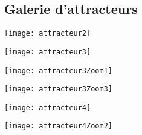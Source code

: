 \documentclass[a4paper,12pt,oneside]{article}
\begin{document}
\subsection{Galerie d'attracteurs}
\newenvironment{changemargin}[2]{\begin{list}{}{%
\setlength{\topsep}{0pt}%
\setlength{\leftmargin}{0pt}%
\setlength{\rightmargin}{0pt}%
\setlength{\listparindent}{\parindent}%
\setlength{\itemindent}{\parindent}%
\setlength{\parsep}{0pt plus 1pt}%
\addtolength{\leftmargin}{#1}%
\addtolength{\rightmargin}{#2}%
}\item }{\end{list}}
\begin{changemargin}{-3cm}{-3cm}

\vspace{0.5cm}
\begin{minipage}{0.65\textwidth}
  \centerline{\texttt{[image: attracteur2]}}
\label{Attracteur2}    
\end{minipage}
\begin{minipage}{0.65\textwidth}
    \centerline{\texttt{[image: attracteur3]}}
\label{Attracteur3} 
\end{minipage}

\vspace{0.5cm}
\begin{minipage}{0.65\textwidth}
    \centerline{\texttt{[image: attracteur3Zoom1]}}
\label{attracteur3Zoom1}   
\end{minipage}
\begin{minipage}{0.65\textwidth}
    \centerline{\texttt{[image: attracteur3Zoom3]}}
\label{attracteur3Zoom3}   
\end{minipage}

\vspace{0.5cm}
\begin{minipage}{0.65\textwidth}
  \centerline{\texttt{[image: attracteur4]}}
\label{attracteur4B}    
\end{minipage}
\begin{minipage}{0.65\textwidth}
  \centerline{\texttt{[image: attracteur4Zoom2]}}
\label{attracteur4Zoom2B}    
\end{minipage}



\end{changemargin}
\end{document}
